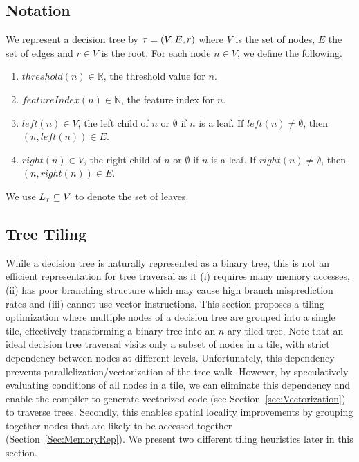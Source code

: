 \subsection{Notation}
We represent a decision tree by $\operatorname{\tau} = (V, E, r)$ where $V$ is the set of nodes, $E$ the set of edges and
$r \in V$ is the root. For each node $n \in V$, we define the following.
\begin{enumerate}
    \item $threshold(n) \in \mathbb{R}$, the threshold value for $n$.
    \item $featureIndex(n) \in \mathbb{N}$, the feature index for $n$.
    \item $left(n) \in V$, the left child of $n$ or $\emptyset$ if $n$ is a leaf. If $left(n) \neq \emptyset$, then $(n, left(n)) \in E$.
    \item $right(n) \in V$, the right child of $n$ or $\emptyset$ if $n$ is a leaf. If $right(n) \neq \emptyset$, then $(n, right(n)) \in E$.
\end{enumerate}
We use $L_{\operatorname{\tau}} \subseteq V$ to denote the set of leaves. %

\subsection{Tree Tiling}
\label{sec:Tiling}

While a decision tree is naturally represented as a binary tree, 
this is not an efficient representation for tree traversal as it (i) requires many memory accesses, 
(ii) has poor branching structure which may cause high branch misprediction rates and (iii) cannot use vector instructions. 
This section proposes a tiling optimization where multiple nodes of a decision tree are grouped into a single tile,
effectively transforming a binary tree into an $n$-ary tiled tree. 
Note that an ideal decision tree traversal visits only a subset of nodes in a tile, with strict dependency between nodes at different levels.
Unfortunately, this dependency prevents parallelization/vectorization of the tree walk. However, by speculatively evaluating conditions 
of all nodes in a tile, we can eliminate this dependency and enable
the compiler to generate vectorized code (see Section~\ref{sec:Vectorization}) to traverse trees.
Secondly, this enables spatial locality improvements by grouping together nodes that are likely to be accessed together (Section~\ref{Sec:MemoryRep}).   
We present two different tiling heuristics later in this section. 

